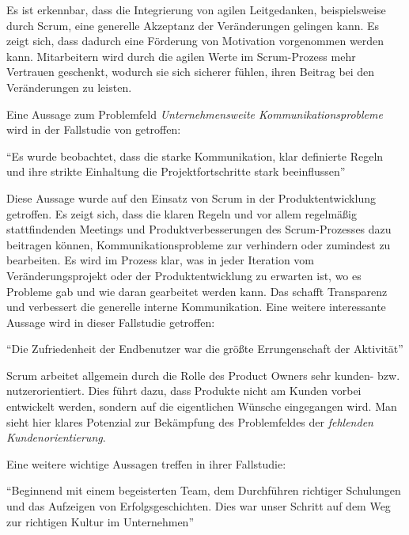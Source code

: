 Es ist erkennbar, dass die Integrierung von agilen Leitgedanken, beispielsweise durch Scrum, eine generelle Akzeptanz der Veränderungen gelingen kann. Es zeigt sich, dass dadurch eine Förderung von Motivation vorgenommen werden kann. Mitarbeitern wird durch die agilen Werte im Scrum-Prozess mehr Vertrauen geschenkt, wodurch sie sich sicherer fühlen, ihren Beitrag bei den Veränderungen zu leisten.

Eine Aussage zum Problemfeld \textit{Unternehmensweite Kommunikationsprobleme} wird in der Fallstudie von  getroffen:

\begin{center}
	``Es wurde beobachtet, dass die starke Kommunikation, klar definierte Regeln und ihre strikte Einhaltung die Projektfortschritte stark beeinflussen'' \cite[S. 4]{alawairdhi_agile_2016}
\end{center}

Diese Aussage wurde auf den Einsatz von Scrum in der Produktentwicklung getroffen. Es zeigt sich, dass die klaren Regeln und vor allem regelmäßig stattfindenden Meetings und Produktverbesserungen des Scrum-Prozesses dazu beitragen können, Kommunikationsprobleme zur verhindern oder zumindest zu bearbeiten. Es wird im Prozess klar, was in jeder Iteration vom Veränderungsprojekt oder der Produktentwicklung zu erwarten ist, wo es Probleme gab und wie daran gearbeitet werden kann. Das schafft Transparenz und verbessert die generelle interne Kommunikation. Eine weitere interessante Aussage wird in dieser Fallstudie getroffen:

\begin{center}
	``Die Zufriedenheit der Endbenutzer war die größte Errungenschaft der Aktivität'' \cite[S. 4]{alawairdhi_agile_2016}
\end{center}

Scrum arbeitet allgemein durch die Rolle des Product Owners sehr kunden- bzw. nutzerorientiert. Dies führt dazu, dass Produkte nicht am Kunden vorbei entwickelt  werden, sondern auf die eigentlichen Wünsche eingegangen wird. Man sieht hier klares Potenzial  zur Bekämpfung des  Problemfeldes der \textit{fehlenden Kundenorientierung}.

Eine weitere wichtige Aussagen treffen  in ihrer Fallstudie:

\begin{center}
	``Beginnend mit einem begeisterten Team, dem Durchführen richtiger Schulungen und das Aufzeigen von Erfolgsgeschichten. Dies war unser Schritt auf dem Weg zur richtigen Kultur im Unternehmen'' \cite[S. 2]{anwar_agile_2016}
\end{center}

